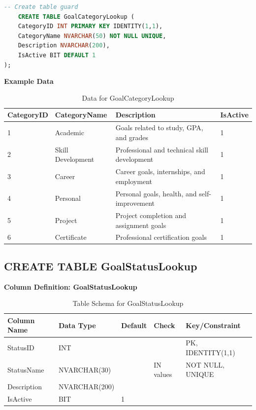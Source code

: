 \documentclass[12pt,a4paper]{report}
\begin{document}
\begin{lstlisting}[language=SQL, caption=Create Table GoalCategoryLookup]
-- Create table guard
    CREATE TABLE GoalCategoryLookup (
    CategoryID INT PRIMARY KEY IDENTITY(1,1),
    CategoryName NVARCHAR(50) NOT NULL UNIQUE,
    Description NVARCHAR(200),
    IsActive BIT DEFAULT 1
);

\end{lstlisting}
\textbf{Example Data}
\begin{table}[h!]
\centering
\begin{tabular}{|l|l|p{8cm}|l|}
\hline
\textbf{CategoryID} & \textbf{CategoryName} & \textbf{Description} & \textbf{IsActive} \\ \hline
1 & Academic & Goals related to study, GPA, and grades & 1 \\ \hline
2 & Skill Development & Professional and technical skill development & 1 \\ \hline
3 & Career & Career goals, internships, and employment & 1 \\ \hline
4 & Personal & Personal goals, health, and self-improvement & 1 \\ \hline
5 & Project & Project completion and assignment goals & 1 \\ \hline
6 & Certificate & Professional certification goals & 1 \\ \hline
\end{tabular}
\caption{Data for GoalCategoryLookup}
\label{tab:goal_category_data}
\end{table}




\subsection{CREATE TABLE GoalStatusLookup}

\textbf{Column Definition: GoalStatusLookup}

\begin{table}[ht]
\centering
\small
\begin{tabular}{|l|l|l|l|l|}
\hline
\textbf{Column Name} & \textbf{Data Type} & \textbf{Default} & \textbf{Check} & \textbf{Key/Constraint} \\ \hline
StatusID & INT & & & PK, IDENTITY(1,1) \\ \hline
StatusName & NVARCHAR(30) & & IN values & NOT NULL, UNIQUE \\ \hline
Description & NVARCHAR(200) & & & \\ \hline
IsActive & BIT & 1 & & \\ \hline
\end{tabular}
\caption{Table Schema for GoalStatusLookup}
\label{tab:goal_status_lookup_schema}
\end{table}
\end{document}
